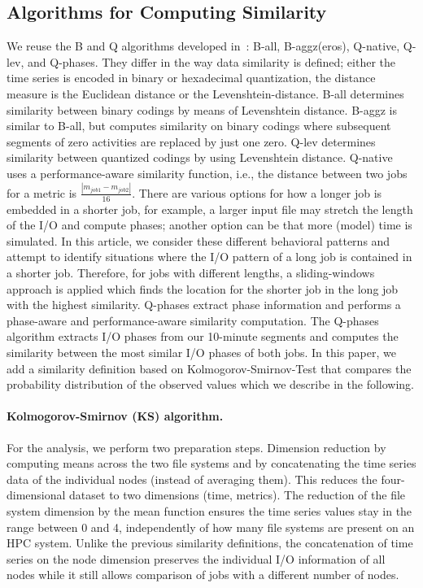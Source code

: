 \documentclass{jhps}
\begin{document}
\subsection{Algorithms for Computing Similarity}
We reuse the B and Q algorithms developed in~\cite{Eugen20HPS}: B-all, B-aggz(eros), Q-native, Q-lev, and Q-phases.
They differ in the way data similarity is defined; either the time series is encoded in binary or hexadecimal quantization, the distance measure is the Euclidean distance or the Levenshtein-distance.
B-all determines similarity between binary codings by means of Levenshtein distance.
B-aggz is similar to B-all, but computes similarity on binary codings where subsequent segments of zero activities are replaced by just one zero.
Q-lev determines similarity between quantized codings by using Levenshtein distance.
Q-native uses a performance-aware similarity function, i.e., the distance between two jobs for a metric is $\frac{|m_{job1} - m_{job2}|}{16}$.
There are various options for how a longer job is embedded in a shorter job, for example, a larger input file may stretch the length of the I/O and compute phases; another option can be that more (model) time is simulated. In this article, we consider these different behavioral patterns and attempt to identify situations where the I/O pattern of a long job is contained in a shorter job. Therefore, for jobs with different lengths, a sliding-windows approach is applied which finds the location for the shorter job in the long job with the highest similarity.
Q-phases extract phase information and performs a phase-aware and performance-aware similarity computation.
The Q-phases algorithm extracts I/O phases from our 10-minute segments and computes the similarity between the most similar I/O phases of both jobs.
In this paper, we add a similarity definition based on Kolmogorov-Smirnov-Test that compares the probability distribution of the observed values which we describe in the following.

\paragraph{Kolmogorov-Smirnov (KS) algorithm.}
For the analysis, we perform two preparation steps.
Dimension reduction by computing means across the two file systems and by concatenating the time series data of the individual nodes (instead of averaging them).
This reduces the four-dimensional dataset to two dimensions (time, metrics).
The reduction of the file system dimension by the mean function ensures the time series values stay in the range between 0 and 4, independently of how many file systems are present on an HPC system.
Unlike the previous similarity definitions, the concatenation of time series on the node dimension preserves the individual I/O information of all nodes while it still allows comparison of jobs with a different number of nodes.
\end{document}
